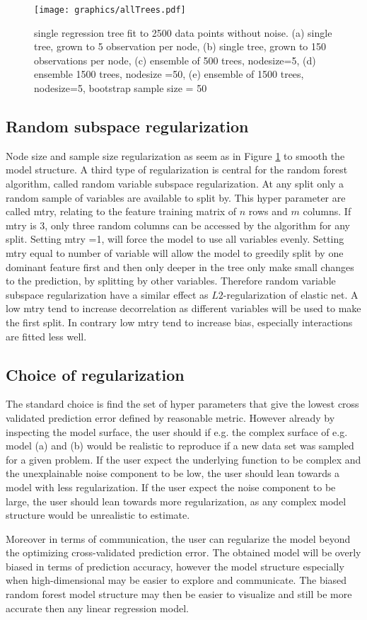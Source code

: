 \begin{figure}[!htbp]
\texttt{[image: graphics/allTrees.pdf]}
\caption{ single regression tree fit to 2500 data points without noise. (a) single tree, grown to 5 observation per node, (b) single tree, grown to 150 observations per node, (c) ensemble of 500 trees, nodesize=5, (d) ensemble 1500 trees, nodesize =50, (e) ensemble of 1500 trees, nodesize=5, bootstrap sample size = 50}
\label{allTrees}
\end{figure}

\subsection{Random subspace regularization}
Node size and sample size regularization as seem as in Figure \ref{allTrees} to smooth the model structure. A third type of regularization is central for the random forest algorithm, called random variable subspace regularization. At any split only a random sample of variables are available to split by. This hyper parameter are called mtry, relating to the feature training matrix of $n$ rows and $m$ columns. If mtry is 3, only three random columns can be accessed by the algorithm for any split. Setting mtry =1, will force the model to use all variables evenly. Setting mtry equal to number of variable will allow the model to greedily split by one dominant feature first and then only deeper in the tree only make small changes to the prediction, by splitting by other variables. Therefore random variable subspace regularization have a similar effect as $L2$-regularization of elastic net. A low mtry tend to increase decorrelation as different variables will be used to make the first split. In contrary low mtry tend to increase bias, especially interactions are fitted less well.

\subsection{Choice of regularization}
The standard choice is find the set of hyper parameters that give the lowest cross validated prediction error defined by reasonable metric. However already by inspecting the model surface, the user should if e.g. the complex surface of e.g. model (a) and (b) would be realistic to reproduce if a new data set was sampled for a given problem. If the user expect the underlying function to be complex and the unexplainable noise component to be low, the user should lean towards a model with less regularization. If the user expect the noise component to be large, the user should lean towards more regularization, as any complex model structure would be unrealistic to estimate.

Moreover in terms of communication, the user can regularize the model beyond the optimizing cross-validated prediction error. The obtained model will be overly biased in terms of prediction accuracy, however the model structure especially when high-dimensional may be easier to explore and communicate. The biased random forest model structure may then be easier to visualize and still be more accurate then any linear regression model.